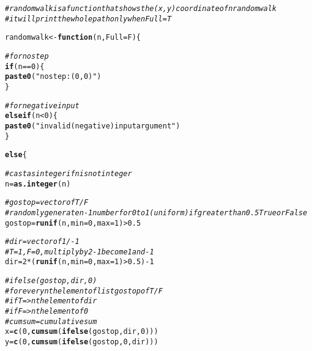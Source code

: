 \documentclass[english]{article}\usepackage[]{graphicx}\usepackage[]{color}
\makeatletter
\newcommand{\hlnum}[1]{\textcolor[rgb]{0.686,0.059,0.569}{#1}}%
\newcommand{\hlstr}[1]{\textcolor[rgb]{0.192,0.494,0.8}{#1}}%
\newcommand{\hlcom}[1]{\textcolor[rgb]{0.678,0.584,0.686}{\textit{#1}}}%
\newcommand{\hlopt}[1]{\textcolor[rgb]{0,0,0}{#1}}%
\newcommand{\hlstd}[1]{\textcolor[rgb]{0.345,0.345,0.345}{#1}}%
\newcommand{\hlkwa}[1]{\textcolor[rgb]{0.161,0.373,0.58}{\textbf{#1}}}%
\newcommand{\hlkwb}[1]{\textcolor[rgb]{0.69,0.353,0.396}{#1}}%
\newcommand{\hlkwc}[1]{\textcolor[rgb]{0.333,0.667,0.333}{#1}}%
\newcommand{\hlkwd}[1]{\textcolor[rgb]{0.737,0.353,0.396}{\textbf{#1}}}%
\newenvironment{kframe}{%
 \def\at@end@of@kframe{}%
 \ifinner\ifhmode%
  \def\at@end@of@kframe{\end{minipage}}%
  \begin{minipage}{\columnwidth}%
 \fi\fi%
 \def\FrameCommand##1{\hskip\@totalleftmargin \hskip-\fboxsep
 \colorbox{shadecolor}{##1}\hskip-\fboxsep
     \hskip-\linewidth \hskip-\@totalleftmargin \hskip\columnwidth}%
 \MakeFramed {\advance\hsize-\width
   \@totalleftmargin\z@ \linewidth\hsize
   \@setminipage}}%
 {\par\unskip\endMakeFramed%
 \at@end@of@kframe}
\newenvironment{knitrout}{}{} %
\makeatother
\begin{document}
\begin{knitrout}
\color{fgcolor}\begin{kframe}
\begin{alltt}
\hlcom{# randomwalk is a function that shows the (x,y) coordinate of n random walk}
\hlcom{# it will print the whole path only when Full=T}

\hlstd{randomwalk} \hlkwb{<-} \hlkwa{function}\hlstd{(}\hlkwc{n}\hlstd{,} \hlkwc{Full} \hlstd{= F)\{}

    \hlcom{#for no step   }
        \hlkwa{if} \hlstd{(n}\hlopt{==}\hlnum{0}\hlstd{)\{}
        \hlkwd{paste0}\hlstd{(}\hlstr{"no step: (0,0)"}\hlstd{)}
        \hlstd{\}}

        \hlcom{#for negative input}
        \hlkwa{else if} \hlstd{(n}\hlopt{<}\hlnum{0}\hlstd{)\{}
        \hlkwd{paste0}\hlstd{(}\hlstr{"invalid (negative) input argument"}\hlstd{)}
        \hlstd{\}}

        \hlkwa{else}\hlstd{\{}

        \hlcom{#cast as integer if n is not integer}
        \hlstd{n} \hlkwb{=} \hlkwd{as.integer}\hlstd{(n)}

        \hlcom{# gostop = vector of T/F      }
        \hlcom{# randomly generate n-1 number for 0 to 1 (uniform) if greater than 0.5 True or False     }
        \hlstd{gostop} \hlkwb{=} \hlkwd{runif}\hlstd{(n,} \hlkwc{min} \hlstd{=} \hlnum{0}\hlstd{,} \hlkwc{max} \hlstd{=} \hlnum{1}\hlstd{)} \hlopt{>} \hlnum{0.5}

        \hlcom{# dir = vector of 1/-1     }
        \hlcom{# T = 1, F = 0, multiply by 2 - 1 become 1 and -1     }
        \hlstd{dir} \hlkwb{=} \hlnum{2}\hlopt{*}\hlstd{(}\hlkwd{runif}\hlstd{(n,} \hlkwc{min} \hlstd{=} \hlnum{0}\hlstd{,} \hlkwc{max} \hlstd{=} \hlnum{1}\hlstd{)} \hlopt{>} \hlnum{0.5}\hlstd{)}\hlopt{-}\hlnum{1}

        \hlcom{# ifelse (gostop,dir,0)     }
        \hlcom{# for every nth element of list gostop of T/F}
        \hlcom{# if T => nth element of dir }
        \hlcom{# if F => nth element of 0       }
        \hlcom{# cumsum = cumulative sum     }
        \hlstd{x} \hlkwb{=} \hlkwd{c}\hlstd{(}\hlnum{0}\hlstd{,}\hlkwd{cumsum}\hlstd{(}\hlkwd{ifelse}\hlstd{(gostop,dir,}\hlnum{0}\hlstd{)))}
        \hlstd{y} \hlkwb{=} \hlkwd{c}\hlstd{(}\hlnum{0}\hlstd{,}\hlkwd{cumsum}\hlstd{(}\hlkwd{ifelse}\hlstd{(gostop,}\hlnum{0}\hlstd{, dir)))}


\end{alltt}
\end{kframe}
\end{knitrout}
\end{document}

